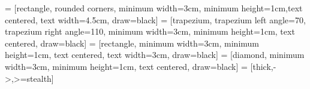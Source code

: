 \setcounter{secnumdepth}{6}


\newcommand{\cir}[1]{\tikz[baseline]{%
    \node[anchor=base, draw, circle, inner sep=0, minimum width=0.5em]{#1};}}

 = [rectangle, rounded corners, minimum width=3cm, minimum height=1cm,text centered, text width=4.5cm, draw=black]
 = [trapezium, trapezium left angle=70, trapezium right angle=110, minimum width=3cm, minimum height=1cm, text centered, draw=black]
 = [rectangle, minimum width=3cm, minimum height=1cm, text centered, text width=3cm, draw=black]
 = [diamond, minimum width=3cm, minimum height=1cm, text centered, draw=black]
 = [thick,->,>=stealth]
\usepackage{titlesec, blindtext, color}
\newcommand{\hsp}{\hspace{20pt}}
\usepackage{amsmath}
\usepackage{amsfonts}
\usepackage{hyperref}

